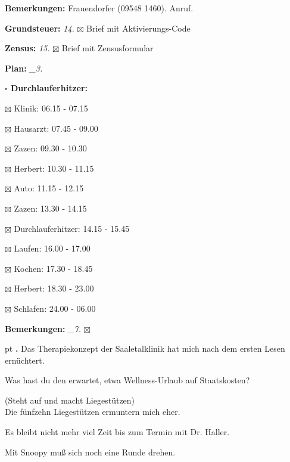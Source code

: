\documentclass[10pt,a4paper]{article}
\newcounter{notec}
\newcommand\notep[1]{%
  \stepcounter{notec}
  \vskip #1pt
  {\bf\arabic{notec}.}
}
\newcommand\prop[1] {{\color {alizarin} {\bf #1}}}             %
\newcommand\opti[1] {{\color {amethyst} {\bf #1}}}             %
\newcommand\mand[1] {{\color {burntorange} {\bf #1}}}          %
\newcommand\topspace{\vskip -15pt \hskip 20pt}
\newcommand\bottomspace{\vskip 4pt}
\newcommand\n[1] { {\sl #1.} \hskip 5pt }
\begin{document}
\begin{mdframed}[style=daystyle]
\begin{labeling}{{\mand {Bemerkungen:}}}
      Frauendorfer (09548 1460). Anruf.
  \item[{\opti {Grundsteuer:}}]    \n{14} $\boxtimes$ Brief mit Aktivierungs-Code
  \item[{\opti {Zensus:}}]    \n{15} $\boxtimes$ Brief mit Zensusformular
  \item[{\mand {Plan:}}]          \n{\_3}
    \topspace
    \begin{minipage}{0.75\textwidth}  
      \begin{labeling}{\prop {$\square$ {Durchlauferhitzer:}}} 
        \setlength\itemsep{-3pt}
      \item[$\boxtimes$ Klinik:]            06.15 - 07.15
      \item[$\boxtimes$ Hausarzt:]          07.45 - 09.00
      \item[$\boxtimes$ Zazen:]             09.30 - 10.30
      \item[$\boxtimes$ Herbert:]           10.30 - 11.15
      \item[$\boxtimes$ Auto:]              11.15 - 12.15
      \item[$\boxtimes$ Zazen:]             13.30 - 14.15
      \item[$\boxtimes$ Durchlauferhitzer:] 14.15 - 15.45        
      \item[$\boxtimes$ Laufen:]            16.00 - 17.00
      \item[$\boxtimes$ Kochen:]            17.30 - 18.45
      \item[$\boxtimes$ Herbert:]           18.30 - 23.00
      \item[$\boxtimes$ Schlafen:]          24.00 - 06.00
      \end{labeling}
    \end{minipage}
    \bottomspace
  \item[{\mand {Bemerkungen:}}]   \n{\_7} $\boxtimes$
  \end{labeling}
    
  \setcounter{notec}{0}

  \notep 0 Das Therapiekonzept der Saaletalklinik hat mich nach dem ersten Lesen
  ernüchtert.

  \vskip 2pt
  Was hast du den erwartet, etwa Wellness-Urlaub auf Staatskosten?

  \vskip 2pt  
  (Steht auf und macht Liegestützen) \\
  Die fünfzehn Liegestützen ermuntern mich eher.

  \vskip 2pt
  Es bleibt nicht mehr viel Zeit bis zum Termin mit Dr. Haller.

  \vskip 2pt
  Mit Snoopy muß sich noch eine Runde drehen.
  
\end{mdframed}
\end{document}
